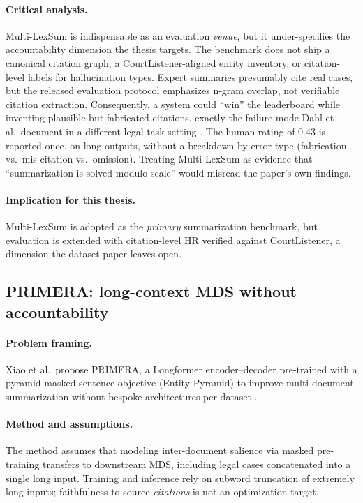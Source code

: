 \paragraph{Critical analysis.}
Multi-LexSum is indispensable as an evaluation \emph{venue}, but it under-specifies the accountability dimension the thesis targets. The benchmark does not ship a canonical citation graph, a CourtListener-aligned entity inventory, or citation-level labels for hallucination types. Expert summaries presumably cite real cases, but the released evaluation protocol emphasizes n-gram overlap, not verifiable citation extraction. Consequently, a system could ``win'' the leaderboard while inventing plausible-but-fabricated citations, exactly the failure mode Dahl et al.\ document in a different legal task setting \cite{dahl2024largelegalfictions}. The human rating of 0.43 is reported once, on long outputs, without a breakdown by error type (fabrication vs.\ mis-citation vs.\ omission). Treating Multi-LexSum as evidence that ``summarization is solved modulo scale'' would misread the paper's own findings.

\paragraph{Implication for this thesis.}
Multi-LexSum is adopted as the \emph{primary} summarization benchmark, but evaluation is extended with citation-level HR verified against CourtListener, a dimension the dataset paper leaves open.

\subsection{PRIMERA: long-context MDS without accountability}
\label{sec:lit-primera}

\paragraph{Problem framing.}
Xiao et al.\ propose PRIMERA, a Longformer encoder--decoder pre-trained with a pyramid-masked sentence objective (Entity Pyramid) to improve multi-document summarization without bespoke architectures per dataset \cite{xiao2022primera}.

\paragraph{Method and assumptions.}
The method assumes that modeling inter-document salience via masked pre-training transfers to downstream MDS, including legal cases concatenated into a single long input. Training and inference rely on subword truncation of extremely long inputs; faithfulness to source \emph{citations} is not an optimization target.

